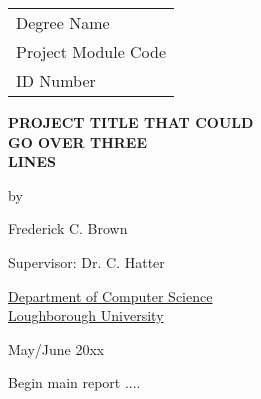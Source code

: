 \documentclass[a4paper]{report}
\begin{document}


\thispagestyle{empty}

\fancypage{}{\fbox}

\begin{center}

\Large{
\hfill \begin{tabular}{l}
Degree Name \\
Project Module Code \\
ID Number
\end{tabular}
}


\vspace*{\fill}

\Large{\textbf{PROJECT TITLE THAT COULD \\
GO OVER THREE \\
LINES}}

\vspace*{\fill}

by

\vspace*{\fill}

Frederick C. Brown


\vspace*{\fill}
Supervisor: Dr. C. Hatter
\vspace*{\fill}

\underline{Department of Computer Science} \\
\underline{Loughborough University}

\vspace*{\fill}
May/June 20xx

\end{center}


\newpage

\fancypage{}{}


Begin main report ....


%


\renewcommand\bibname{References}
%

%
\end{document}
